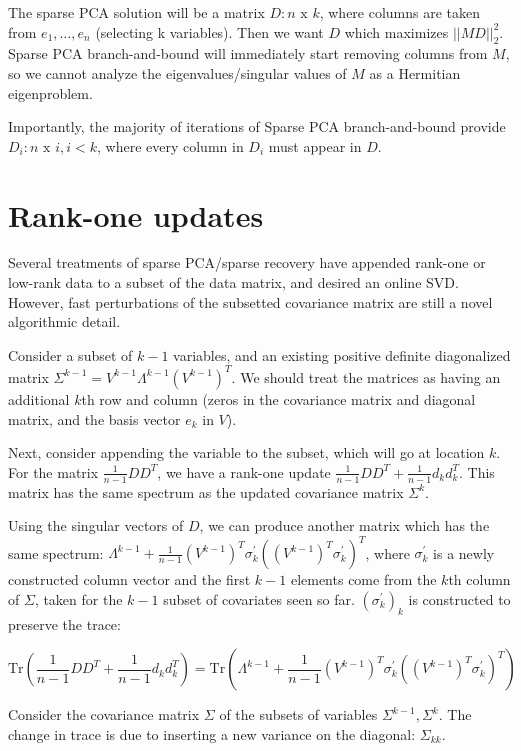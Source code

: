 \documentclass{article}
\begin{document}
The sparse PCA solution will be a matrix $D : n\text{ x }k$, where columns are taken from $e_1,\dots,e_n$ (selecting k variables). Then we want $D$ which maximizes $||MD||_2^2$. Sparse PCA branch-and-bound will immediately start removing columns from $M$, so we cannot analyze the eigenvalues/singular values of $M$ as a Hermitian eigenproblem.

Importantly, the majority of iterations of Sparse PCA branch-and-bound provide $D_i : n\text{ x }i, i < k$, where every column in $D_i$ must appear in $D$.

\section{Rank-one updates}

Several treatments of sparse PCA/sparse recovery have appended rank-one or low-rank data to a subset of the data matrix, and desired an online SVD. However, fast perturbations of the subsetted covariance matrix are still a novel algorithmic detail.

Consider a subset of $k-1$ variables, and an existing positive definite diagonalized matrix $\Sigma^{k-1} = V^{k-1} \Lambda^{k-1} \left(V^{k-1}\right)^T$. We should treat the matrices as having an additional $k$th row and column (zeros in the covariance matrix and diagonal matrix, and the basis vector $e_k$ in $V$).

Next, consider appending the variable to the subset, which will go at location $k$. For the matrix $\frac{1}{n-1} D D^T$, we have a rank-one update $\frac{1}{n-1} D D^T + \frac{1}{n-1} d_k d_k^T$. This matrix has the same spectrum as the updated covariance matrix $\Sigma^k$.

Using the singular vectors of $D$, we can produce another matrix which has the same spectrum: $\Lambda^{k-1} + \frac{1}{n-1} \left(V^{k-1}\right)^T\sigma_k^\prime (\left(V^{k-1}\right)^T \sigma_k^\prime)^T$, where $\sigma_k^\prime$ is a newly constructed column vector and the first $k-1$ elements come from the $k$th column of $\Sigma$, taken for the $k-1$ subset of covariates seen so far. $\left(\sigma_k^\prime\right)_k$ is constructed to preserve the trace:

$$
\text{Tr}\left(\frac{1}{n-1} D D^T + \frac{1}{n-1} d_k d_k^T\right)
= \text{Tr}\left( \Lambda^{k-1} + \frac{1}{n-1} \left(V^{k-1}\right)^T\sigma_k^\prime (\left(V^{k-1}\right)^T \sigma_k^\prime)^T \right)
$$

Consider the covariance matrix $\Sigma$ of the subsets of variables $\Sigma^{k-1}, \Sigma^k$. The change in trace is due to inserting a new variance on the diagonal: $\Sigma_{kk}$.
\end{document}
